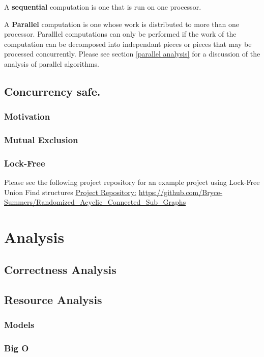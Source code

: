 \documentclass[12pt, letterpaper]{book}
\begin{document}
	A \textbf{sequential} computation is one that is run on one processor.

	A \textbf{Parallel} computation is one whose work is distributed to more than one processor. Paralllel computations can only be performed if the work of the computation can be decomposed into independant pieces or pieces that may be processed concurrently. Please see section \ref{parallel analysis} for a discussion of the analysis of parallel algorithms.

\section{Concurrency safe.}
	\subsection{Motivation}
	\subsection{Mutual Exclusion}
	\subsection{Lock-Free}

Please see the following project repository for an example project using Lock-Free Union Find structures \href{https://github.com/Bryce-Summers/Randomized_Acyclic_Connected_Sub_Graphs}{Project Repository:}
\url{https://github.com/Bryce-Summers/Randomized_Acyclic_Connected_Sub_Graphs} 

\chapter{Analysis} \label{analysis}

	\section{Correctness Analysis}

	\section{Resource Analysis}
		\subsection{Models}
		\subsection{Big O}
\end{document}
